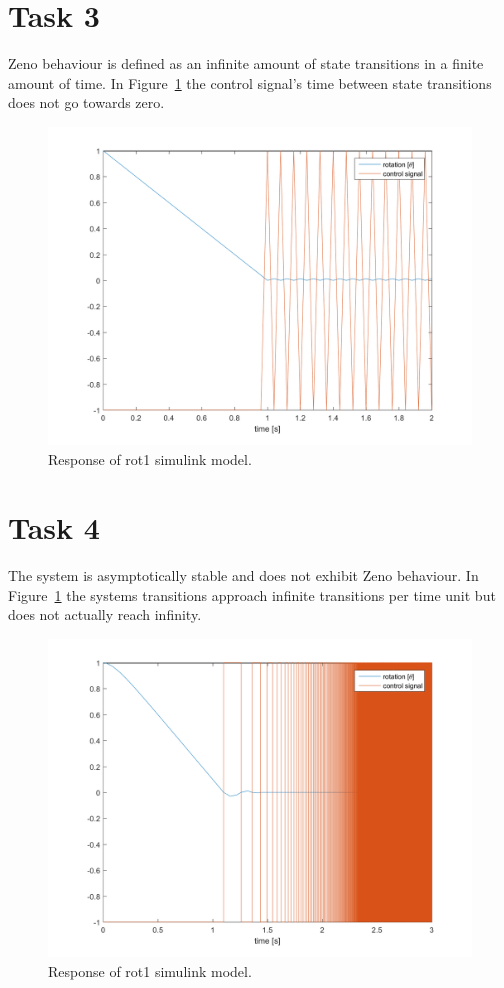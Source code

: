 \documentclass[a4paper,12pt,oneside,onecolumn]{article} %
\begin{document}
\section*{Task 3}
	Zeno behaviour is defined as an infinite amount of state transitions in a finite amount of time. In Figure~\ref{fig:task3_plot} the control signal's time between state transitions does not go towards zero.
	\begin{figure}[H]
        \centering
        \includegraphics[width=1\linewidth]{../matlab/images/task3_plot.png}
        \caption{Response of rot1 simulink model.}
        \label{fig:task3_plot}
    \end{figure}

\section*{Task 4}

	The system is asymptotically stable and does not exhibit Zeno behaviour. In Figure~\ref{fig:task3_plot} the systems transitions approach infinite transitions per time unit but does not actually reach infinity.
	\begin{figure}[H]
        \centering
        \includegraphics[width=1\linewidth]{../matlab/images/task4_plot.png}
        \caption{Response of rot1 simulink model.}
        \label{fig:task4_plot}
    \end{figure}
\end{document}
